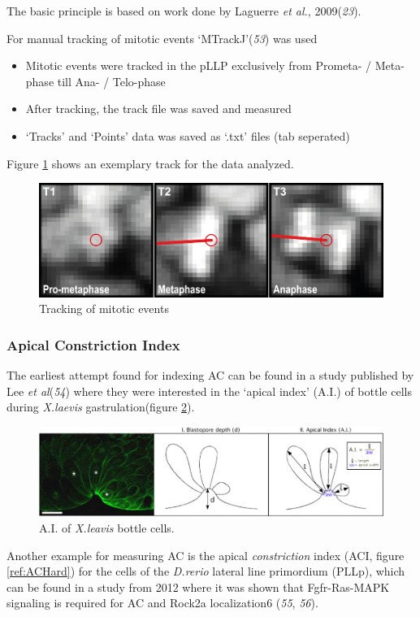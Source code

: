 \documentclass[11pt,singlespacinge,twoside]{reedthesis} %
\providecommand{\tightlist}{%
  \setlength{\itemsep}{0pt}\setlength{\parskip}{0pt}}
\begin{document}
The basic principle is based on work done by Laguerre \emph{et al.}, 2009(\emph{23}).

\noindent For manual tracking of mitotic events `MTrackJ'(\emph{53}) was used
\begin{itemize}
\tightlist
\item
  Mitotic events were tracked in the pLLP exclusively from Prometa- / Meta-phase till Ana- / Telo-phase
\item
  After tracking, the track file was saved and measured
\item
  `Tracks' and `Points' data was saved as `.txt' files (tab seperated)
\end{itemize}
\noindent Figure \ref{fig:mitodatapoints} shows an exemplary track for the data analyzed.


\begin{figure}

{\centering \includegraphics[width=0.5\linewidth]{figure/02-MaMo/Prol/Prolif} 

}

\caption{Tracking of mitotic events}\label{fig:mitodatapoints}
\end{figure}
\hypertarget{ACI}{%
\subsubsection{Apical Constriction Index}\label{ACI}}

The earliest attempt found for indexing AC can be found in a study published by Lee \emph{et al}(\emph{54}) where they were interested in the `apical index' (A.I.) of bottle cells during \emph{X.laevis} gastrulation(figure \ref{fig:ACLee}).


\begin{figure}

{\centering \includegraphics[width=0.75\linewidth]{figure/02-MaMo/ACI/Jen_yi_Lee} 

}

\caption{A.I. of \emph{X.leavis} bottle cells.}\label{fig:ACLee}
\end{figure}
\noindent Another example for measuring AC is the apical \emph{constriction} index (ACI, figure \ref{ref:ACHard}) for the cells of the \emph{D.rerio} lateral line primordium (PLLp), which can be found in a study from 2012 where it was shown that Fgfr-Ras-MAPK signaling is required for AC and Rock2a localization6 (\emph{55}, \emph{56}).
\end{document}
